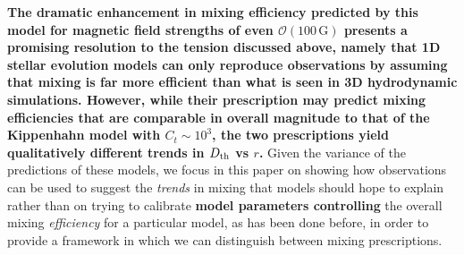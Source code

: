 \textbf{The dramatic enhancement in mixing efficiency predicted by this model for magnetic field strengths of even $\mathcal{O}(100\,\mathrm{G})$ presents a promising resolution to the tension discussed above, namely that 1D stellar evolution models can only reproduce observations by assuming that mixing is far more efficient than what is seen in 3D hydrodynamic simulations. 
However, while their prescription may predict mixing efficiencies that are comparable in overall magnitude to that of the Kippenhahn model with $C_t \sim 10^3$, the two prescriptions yield qualitatively different trends in $D_\mathrm{th}$ vs $r$.} 
Given the variance of the predictions of these models, we focus in this paper on showing how observations can be used to suggest the \textit{trends} in mixing that models should hope to explain rather than on trying to calibrate \textbf{model parameters controlling} the overall mixing \textit{efficiency} for a particular model, as has been done before, in order to provide a framework in which we can distinguish between mixing prescriptions.


